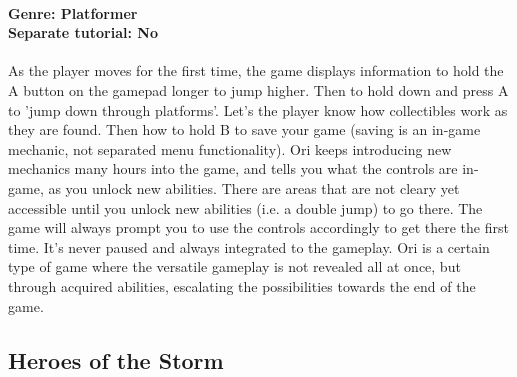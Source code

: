 \paragraph{Genre: Platformer \\ Separate tutorial: No \\}
As the player moves for the first time, the game displays information to hold the A button on the gamepad longer to jump higher.
Then to hold down and press A to 'jump down through platforms'.
Let's the player know how collectibles work as they are found.
Then how to hold B to save your game (saving is an in-game mechanic, not separated menu functionality).
Ori keeps introducing new mechanics many hours into the game, and tells you what the controls are in-game, as you unlock new abilities.
There are areas that are not cleary yet accessible until you unlock new abilities (i.e. a double jump) to go there. The game will always prompt you to use the controls accordingly to get there the first time. It's never paused and always integrated to the gameplay.
Ori is a certain type of game where the versatile gameplay is not revealed all at once, but through acquired abilities, escalating the possibilities towards the end of the game.

\subsection{Heroes of the Storm}
